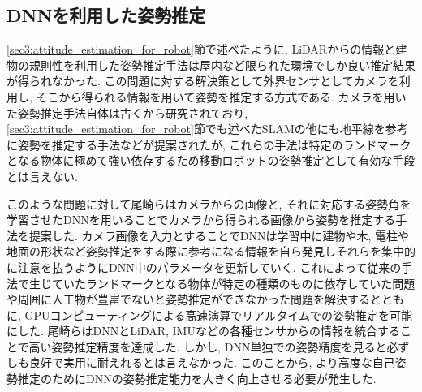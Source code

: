 \subsection{DNNを利用した姿勢推定}\label{sec3:camera_dnn_attitude_estimation}
\ref{sec3:attitude_estimation_for_robot}節で述べたように, LiDARからの情報と建物の規則性\cite{マンハッタンワールド仮説}を利用した姿勢推定手法\cite{ozaki_lidar_normal}は屋内など限られた環境でしか良い推定結果が得られなかった. この問題に対する解決策として外界センサとしてカメラを利用し, そこから得られる情報を用いて姿勢を推定する方式である. カメラを用いた姿勢推定手法自体は古くから研究されており, \ref{sec3:attitude_estimation_for_robot}節でも述べたSLAMの他にも地平線を参考に姿勢を推定する手法\cite{地平線による姿勢推定1}\cite{地平線による姿勢推定2}などが提案されたが, これらの手法は特定のランドマークとなる物体に極めて強い依存するため移動ロボットの姿勢推定として有効な手段とは言えない.\par
このような問題に対して尾崎らはカメラからの画像と, それに対応する姿勢角を学習させたDNNを用いることでカメラから得られる画像から姿勢を推定する手法を提案した\cite{Ozaki_SII2021}. カメラ画像を入力とすることでDNNは学習中に建物や木, 電柱や地面の形状など姿勢推定をする際に参考になる情報を自ら発見しそれらを集中的に注意を払うようにDNN中のパラメータを更新していく. これによって従来の手法で生じていたランドマークとなる物体が特定の種類のものに依存していた問題や周囲に人工物が豊富でないと姿勢推定ができなかった問題を解決するとともに, GPUコンピューティングによる高速演算でリアルタイムでの姿勢推定を可能にした. 尾崎らはDNNとLiDAR, IMUなどの各種センサからの情報を統合することで高い姿勢推定精度を達成した\cite{Ozaki_springer_Camera_and_IMU_EKF}\cite{Ozaki_IEEE_Camera_and_IMU_EKF}\cite{Ozaki_springer_Camera_and_LiDAR_DNN}. しかし, DNN単独での姿勢精度を見ると必ずしも良好で実用に耐えれるとは言えなかった. このことから, より高度な自己姿勢推定のためにDNNの姿勢推定能力を大きく向上させる必要が発生した.

